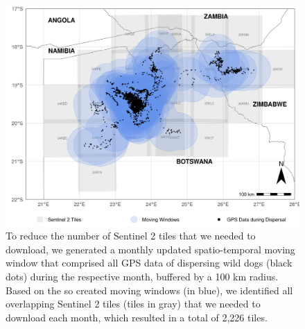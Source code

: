 \documentclass[../FinalThesis.tex]{subfiles}
\begin{document}
\begin{figure}[htpb]
 \begin{center}
  \includegraphics[width = \textwidth]{Figures/MovingWindows.png}
  \caption{To reduce the number of Sentinel 2 tiles that we needed to download,
  we generated a monthly updated spatio-temporal moving window that comprised
  all GPS data of dispersing wild dogs (black dots) during the respective month,
  buffered by a 100 km radius. Based on the so created moving windows (in blue),
  we identified all overlapping Sentinel 2 tiles (tiles in gray) that we needed
  to download each month, which resulted in a total of 2,226 tiles.}
  \label{MovingWindows}
 \end{center}
\end{figure}
\end{document}
